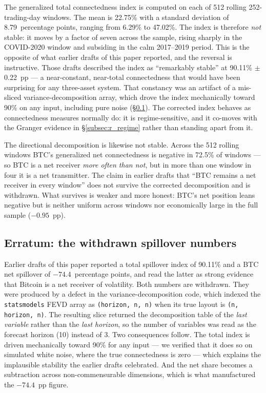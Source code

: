 \documentclass[11pt,a4paper]{article}
\begin{document}
The generalized total connectedness index is computed on each of 512 rolling 252-trading-day windows. The mean is 22.75\% with a standard deviation of 8.79~percentage points, ranging from 6.29\% to 47.02\%.%
 The index is therefore \emph{not} stable: it moves by a factor of seven across the sample, rising sharply in the COVID-2020 window and subsiding in the calm 2017--2019 period. This is the opposite of what earlier drafts of this paper reported, and the reversal is instructive. Those drafts described the index as ``remarkably stable'' at 90.11\% $\pm$ 0.22~pp --- a near-constant, near-total connectedness that would have been surprising for any three-asset system. That constancy was an artifact of a mis-sliced variance-decomposition array, which drove the index mechanically toward 90\% on any input, including pure noise (\S\ref{subsec:r_erratum}). The corrected index behaves as connectedness measures normally do: it is regime-sensitive, and it co-moves with the Granger evidence in \S\ref{subsec:r_regime} rather than standing apart from it.

The directional decomposition is likewise not stable. Across the 512 rolling windows BTC's generalized net connectedness is negative in 72.5\% of windows --- so BTC is a net receiver \emph{more often than not}, but in more than one window in four it is a net transmitter.%
 The claim in earlier drafts that ``BTC remains a net receiver in every window'' does not survive the corrected decomposition and is withdrawn. What survives is weaker and more honest: BTC's net position leans negative but is neither uniform across windows nor economically large in the full sample ($-0.95$~pp).

\subsection{Erratum: the withdrawn spillover numbers}
\label{subsec:r_erratum}

Earlier drafts of this paper reported a total spillover index of 90.11\% and a BTC net spillover of $-74.4$~percentage points, and read the latter as strong evidence that Bitcoin is a net receiver of volatility. Both numbers are withdrawn. They were produced by a defect in the variance-decomposition code, which indexed the \texttt{statsmodels} FEVD array as \texttt{(horizon, n, n)} when its true layout is \texttt{(n, horizon, n)}. The resulting slice returned the decomposition table of the \emph{last variable} rather than the \emph{last horizon}, so the number of variables was read as the forecast horizon (10) instead of 3. Two consequences follow. The total index is driven mechanically toward 90\% for any input --- we verified that it does so on simulated white noise, where the true connectedness is zero --- which explains the implausible stability the earlier drafts celebrated. And the net share becomes a subtraction across non-commensurable dimensions, which is what manufactured the $-74.4$~pp figure.
\end{document}
